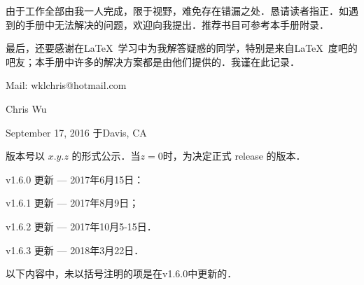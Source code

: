 由于工作全部由我一人完成，限于视野，难免存在错漏之处．恳请读者指正．如遇到的手册中无法解决的问题，欢迎向我提出．推荐书目可参考本手册附录．

最后，还要感谢在\LaTeX\ 学习中为我解答疑惑的同学，特别是来自\LaTeX\ 度吧的吧友；本手册中许多的解决方案都是由他们提供的．我谨在此记录．

\vfill

\begin{flushright}
Mail: wklchris@hotmail.com\dpar

Chris Wu

September 17, 2016 于Davis, CA
\end{flushright}
\clearpage
{}\dpar\dpar

版本号以 $x.y.z$ 的形式公示．当$z=0$时，为决定正式 release 的版本．

v1.6.0 更新 --- 2017年6月15日：

v1.6.1 更新 --- 2017年8月9日；

v1.6.2 更新 --- 2017年10月5-15日．

v1.6.3 更新 --- 2018年3月22日．\dpar

以下内容中，未以括号注明的项是在v1.6.0中更新的．

